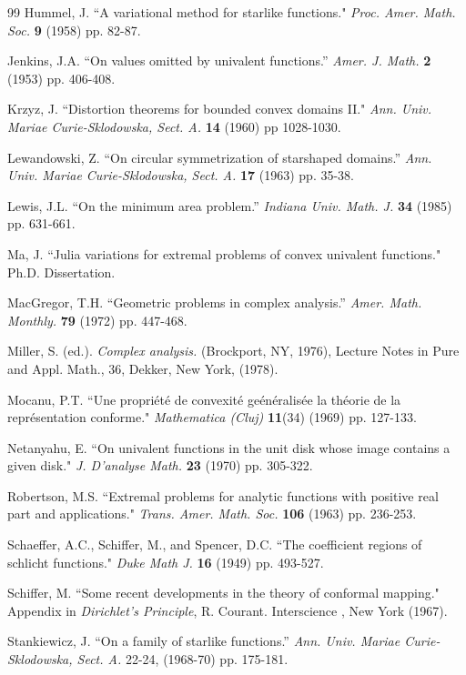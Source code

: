 \documentclass[final]{siamltex}
\begin{document}
\begin{thebibliography}{99}
 Hummel, J. ``A variational method for starlike functions."
{\em Proc. Amer. Math. Soc.} {\bf 9} (1958) pp. 82-87.

 Jenkins, J.A.  ``On values omitted by univalent
functions.''  {\em Amer. J. Math.} {\bf 2} (1953) pp. 406-408.

 Krzyz, J. ``Distortion theorems for bounded convex domains II."
{\em Ann. Univ. Mariae Curie-Sklodowska, Sect. A.} {\bf 14} (1960) pp 1028-1030.

 Lewandowski, Z.  ``On circular symmetrization of
starshaped domains.''  {\em Ann. Univ. Mariae Curie-Sklodowska, Sect.
A.}  {\bf 17} (1963) pp. 35-38.

 Lewis, J.L.  ``On the minimum area problem.''  {\em
Indiana Univ. Math. J.}  {\bf 34} (1985) pp. 631-661.

 Ma, J. ``Julia variations for extremal problems of convex univalent functions."
Ph.D. Dissertation.

 MacGregor, T.H.  ``Geometric problems in complex
analysis.''  {\em Amer. Math. Monthly.}  {\bf 79} (1972) pp.
447-468.

 Miller, S. (ed.).  {\em Complex analysis.}
(Brockport, NY, 1976), Lecture Notes in Pure and Appl. Math., 
36, Dekker, New York, (1978).

 Mocanu, P.T. ``Une propri\'et\'e de convexit\'e ge\'en\'eralis\'ee
la th\'eorie de la repr\'esentation conforme."  {\em Mathematica (Cluj)} {\bf 11}(34)
(1969) pp. 127-133.

 Netanyahu, E. ``On univalent functions in the unit disk whose
image contains a given disk."  {\em J. D'analyse Math.} {\bf 23} (1970) pp. 305-322.

 Robertson, M.S. ``Extremal problems for analytic functions with positive
real part and applications." {\em Trans. Amer. Math. Soc.} {\bf 106} (1963) pp. 236-253.

 Schaeffer, A.C., Schiffer, M., and Spencer, D.C. ``The coefficient regions
of schlicht functions." {\em Duke Math J.} {\bf 16} (1949) pp. 493-527.

 Schiffer, M. ``Some recent developments in the theory of
conformal mapping." Appendix in {\em Dirichlet's Principle}, R. Courant.  Interscience , New York (1967).

 Stankiewicz, J.  ``On a family of starlike
functions.''  {\em Ann. Univ. Mariae Curie-Sklodowska, Sect. A.}
22-24, (1968-70) pp. 175-181.


\end{thebibliography}
\end{document}
